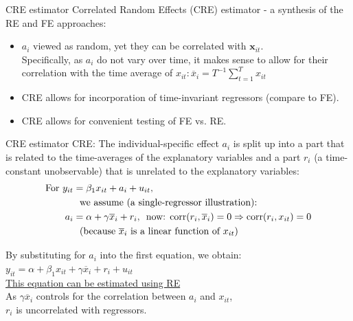 \documentclass[usenames,dvipsnames]{beamer}
\begin{document}
\begin{frame}{CRE estimator}
Correlated Random Effects (CRE) estimator - a synthesis of the RE and FE approaches: 
\vspace{0.5cm}
\begin{itemize}
\item $a_i$ viewed as random, yet they can be correlated with $\bm{x}_{it}$.\\
\vspace{0.2cm}
Specifically, as $a_i$ do not vary over time, it makes sense to allow for their correlation with the time average of $x_{it}:\overline{x}_i = T^{-1} \sum^T_{t=1}x_{it}$
\vspace{0.2cm}
\item CRE allows for incorporation of time-invariant regressors (compare to FE).
\vspace{0.2cm}
\item CRE allows for convenient testing of FE vs. RE.
\end{itemize}
\end{frame}
\begin{frame}{CRE estimator}
CRE: The individual-specific effect $a_i$ is split up into a part that is related to the time-averages of the explanatory variables and a part $r_i$ (a time-constant unobservable) that is unrelated to the explanatory variables: 
\begin{align*}
\textnormal{For } y_{it} & =  \beta_1 x_{it} + a_i + u_{it}, \\
&\textnormal{~~we assume (a single-regressor illustration):}\\ 
a_i & = \alpha + \gamma \overline{x}_i + r_i \textnormal{,~~now: } \textnormal{corr}(r_i, \overline{x}_i) = 0 \Rightarrow \textnormal{corr}(r_i,x_{it}) = 0\\ 
&\textnormal{~~(because $\overline{x}_i$  is a linear function of  $x_{it}$)}
\end{align*}

By substituting for $a_i$ into the first equation, we obtain: \\
$y_{it} = \alpha + \beta_1 x_{it} + \gamma \overline{x}_i + r_i + u_{it}$ \\
\bigskip
\underline{This equation can be estimated using RE}\\
As $\gamma \overline{x}_i$ controls for the correlation between $a_i$ and $x_{it}$, \\$r_i$ is uncorrelated with regressors.
\end{frame}
\end{document}

